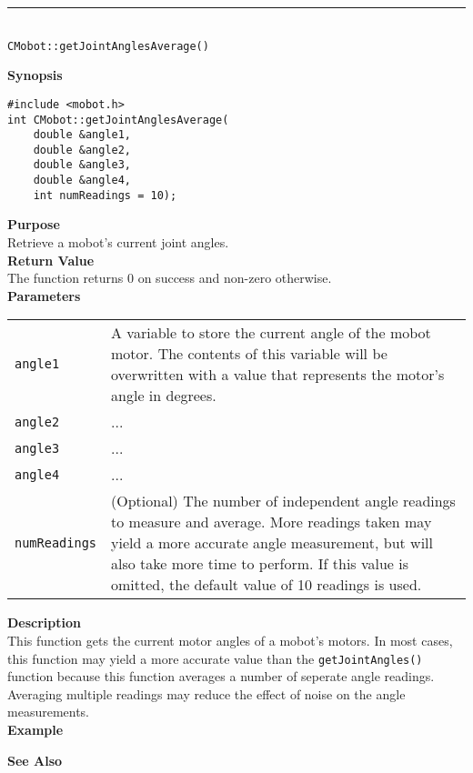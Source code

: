 \noindent
\vspace{5pt}
\rule{4.5in}{0.015in}\\
\noindent
{\LARGE \texttt{CMobot::getJointAnglesAverage()}}\\
{}

\noindent
{\bf Synopsis}
\vspace{-8pt}
\begin{verbatim}
#include <mobot.h>
int CMobot::getJointAnglesAverage(
    double &angle1,
    double &angle2,
    double &angle3,
    double &angle4,
    int numReadings = 10);
\end{verbatim}

\noindent
{\bf Purpose}\\
Retrieve a mobot's current joint angles.\\

\noindent
{\bf Return Value}\\
The function returns 0 on success and non-zero otherwise.\\

\noindent
{\bf Parameters}\\
\vspace{-0.1in}
\begin{description}
\item               
\begin{tabular}{p{15 mm}p{145 mm}}
\texttt{angle1} & A variable to store the current angle of the mobot
motor. The contents of this variable will be overwritten with a value that
represents the motor's angle in degrees.  \\
\texttt{angle2} & ...  \\
\texttt{angle3} & ...  \\
\texttt{angle4} & ...  \\
\texttt{numReadings} & (Optional) The number of independent angle readings to measure 
and average. More readings taken may yield a more accurate angle measurement, but will also
take more time to perform. If this value is omitted, the default value of 10 readings is
used.
\end{tabular}
\end{description}

\noindent
{\bf Description}\\
This function gets the current motor angles of a mobot's motors. In most cases, this
function may yield a more accurate value than the \texttt{getJointAngles()} function
because this function averages a number of seperate angle readings. Averaging multiple 
readings may reduce the effect of noise on the angle measurements.
\\
\noindent
{\bf Example}\\
\noindent

\noindent
{\bf See Also}\\

